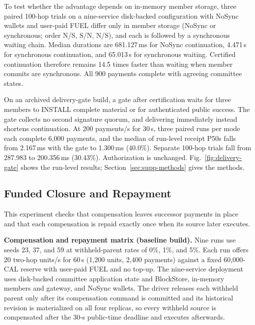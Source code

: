 To test whether the advantage depends on in-memory member storage, three paired 100-hop trials on a nine-service disk-backed
configuration with NoSync wallets and user-paid FUEL differ only in member
storage (NoSync or synchronous; order N/S, S/N, N/S), and each is followed by
a synchronous waiting chain. Median durations are 681.127\,ms for NoSync
continuation, 4.471\,s for synchronous continuation, and 65.013\,s for
synchronous waiting. Certified continuation therefore remains 14.5 times
faster than waiting when member commits are synchronous. All 900 payments
complete with agreeing committee states.

On an archived delivery-gate build, a gate after certification waits for three
members to INSTALL complete material or for authenticated public success.
The gate collects no second signature quorum, and delivering immediately
instead shortens continuation. At 200
payments/s for 30\,s, three paired runs per mode each complete 6,000
payments, and the median of run-level receipt P50s falls from 2.167\,ms with
the gate to 1.300\,ms (40.0\%). Separate 100-hop trials fall from 287.983 to
200.356\,ms (30.43\%). Authorization is unchanged.
Fig.~\ref{fig:delivery-gate} shows the run-level results;
Section~\ref{sec:supp-methods} gives the methods.

\subsection{Funded Closure and Repayment}
\label{archive:sec:eval-liabilities}

This experiment checks that compensation leaves successor payments in place
and that each compensation is repaid exactly once when its source later
executes.

\noindent\textbf{Compensation and repayment matrix (baseline build).}
Nine runs use seeds 23, 37, and 59 at withheld-parent rates of 0\%, 1\%, and
5\%. Each run offers 20 two-hop units/s for 60\,s (1,200 units, 2,400
payments) against a fixed 60,000-CAL reserve with user-paid FUEL and no
top-up. The nine-service deployment uses disk-backed committee application
state and BlockStore, in-memory members and gateway, and NoSync wallets. The
driver releases each withheld parent only after its compensation command is committed
and its historical revision is materialized on all four replicas, so every withheld source is compensated
after the 30-s public-time deadline and executes afterwards.


